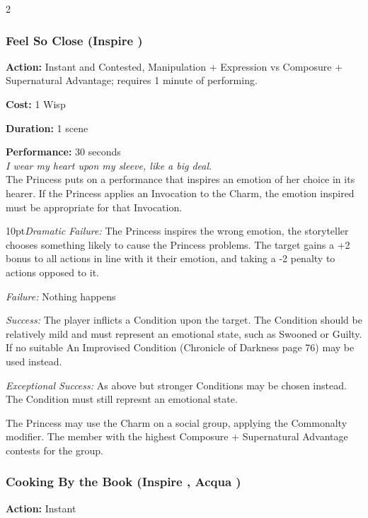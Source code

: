 \begin{multicols}{2}
\subsubsection*{Feel So Close (Inspire \textbullet)}

\noindent \textbf{Action:} Instant and Contested, Manipulation + Expression vs Composure + Supernatural Advantage; requires 1 minute of performing. 

\noindent \textbf{Cost:} 1 Wisp

\noindent \textbf{Duration:} 1 scene

\noindent \textbf{Performance:} 30 seconds \\

\textit{I wear my heart upon my sleeve, like a big deal.} \\

\noindent The Princess puts on a performance that inspires an emotion of her choice in its hearer. If the Princess applies an Invocation to the Charm, the emotion inspired must be appropriate for that Invocation.

\begin{myindentpar}{10pt}\emph{Dramatic Failure:} The Princess inspires the wrong emotion, the storyteller chooses something likely to cause the Princess problems. The target gains a +2 bonus to all actions in line with it their emotion, and taking a -2 penalty to actions opposed to it.
 
 \emph{Failure:} Nothing happens
 
 \emph{Success:} The player inflicts a Condition upon the target. The Condition should be relatively mild and must represent an emotional state, such as Swooned or Guilty. If no suitable An Improvised Condition (Chronicle of Darkness page 76) may be used instead. 
 
 \emph{Exceptional Success:} As above but stronger Conditions may be chosen instead. The Condition must still represnt an emotional state. \end{myindentpar}

The Princess may use the Charm on a social group, applying the Commonalty modifier. The member with the highest Composure + Supernatural Advantage contests for the group.

\subsubsection*{Cooking By the Book (Inspire \textbullet, Acqua \textbullet)}

\noindent \textbf{Action:} Instant


\end{multicols}
